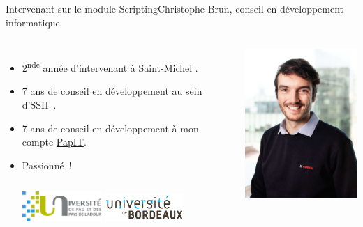 \documentclass{beamer}
\begin{document}
    \begin{frame}{Intervenant sur le module Scripting}{Christophe Brun, conseil en développement informatique}

        \begin{columns}
            \begin{itemize}
                \item 2\textsuperscript{nde} année d'intervenant à Saint-Michel .

                \item 7 ans de conseil en développement au sein d'SSII~.

                \item 7 ans de conseil en développement à mon compte \href{https://papit.fr}{PapIT}.

                \item Passionné~!
                \bigbreak
                \begin{columns}
                    \centering
                    \includegraphics[width=3cm]{image/logo-uppa}
                    \centering
                    \includegraphics[width=3cm]{image/logo-universite-bordeaux}
                \end{columns}
            \end{itemize}
            \centering
            \includegraphics[width=5cm]{image/trombine-christophe}
        \end{columns}
    \end{frame}
\end{document}
